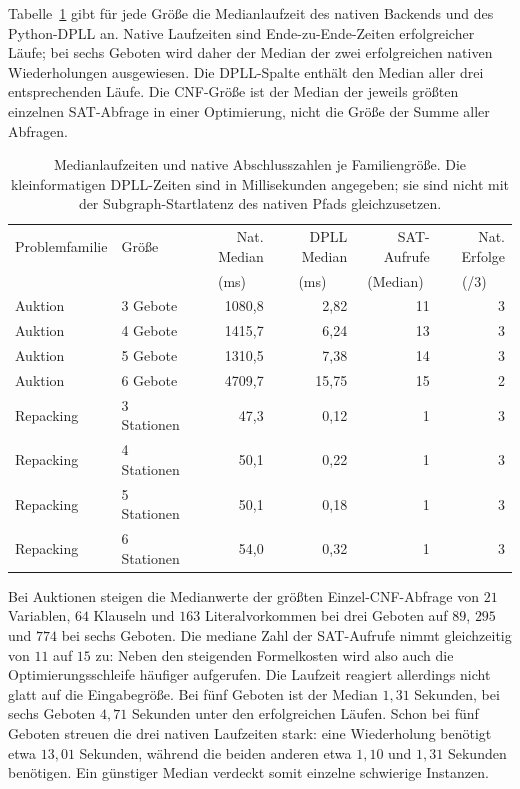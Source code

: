 \documentclass[a4paper,12pt]{article}
\theoremstyle{definition}
\begin{document}
Tabelle~\ref{tab:eco-experiment-runtime} gibt für jede Größe die Medianlaufzeit des nativen Backends und des Python-DPLL an. Native Laufzeiten sind Ende-zu-Ende-Zeiten erfolgreicher Läufe; bei sechs Geboten wird daher der Median der zwei erfolgreichen nativen Wiederholungen ausgewiesen. Die DPLL-Spalte enthält den Median aller drei entsprechenden Läufe. Die CNF-Größe ist der Median der jeweils größten einzelnen SAT-Abfrage in einer Optimierung, nicht die Größe der Summe aller Abfragen.

\begin{table}[ht]
\centering\small
\begin{tabular}{llrrrr}
\toprule
Problemfamilie & Größe & Nat. Median & DPLL Median & SAT-Aufrufe & Nat. Erfolge\\
 & & \multicolumn{1}{c}{(ms)} & \multicolumn{1}{c}{(ms)} & \multicolumn{1}{c}{(Median)} & \multicolumn{1}{c}{(/3)}\\
\midrule
Auktion & 3 Gebote & 1080{,}8 & 2{,}82 & 11 & 3\\
Auktion & 4 Gebote & 1415{,}7 & 6{,}24 & 13 & 3\\
Auktion & 5 Gebote & 1310{,}5 & 7{,}38 & 14 & 3\\
Auktion & 6 Gebote & 4709{,}7 & 15{,}75 & 15 & 2\\
\midrule
Repacking & 3 Stationen & 47{,}3 & 0{,}12 & 1 & 3\\
Repacking & 4 Stationen & 50{,}1 & 0{,}22 & 1 & 3\\
Repacking & 5 Stationen & 50{,}1 & 0{,}18 & 1 & 3\\
Repacking & 6 Stationen & 54{,}0 & 0{,}32 & 1 & 3\\
\bottomrule
\end{tabular}
\caption{Medianlaufzeiten und native Abschlusszahlen je Familiengröße. Die kleinformatigen DPLL-Zeiten sind in Millisekunden angegeben; sie sind nicht mit der Subgraph-Startlatenz des nativen Pfads gleichzusetzen.}
\label{tab:eco-experiment-runtime}
\end{table}

Bei Auktionen steigen die Medianwerte der größten Einzel-CNF-Abfrage von \(21\) Variablen, \(64\) Klauseln und \(163\) Literalvorkommen bei drei Geboten auf \(89\), \(295\) und \(774\) bei sechs Geboten. Die mediane Zahl der SAT-Aufrufe nimmt gleichzeitig von \(11\) auf \(15\) zu: Neben den steigenden Formelkosten wird also auch die Optimierungsschleife häufiger aufgerufen. Die Laufzeit reagiert allerdings nicht glatt auf die Eingabegröße. Bei fünf Geboten ist der Median \(1{,}31\) Sekunden, bei sechs Geboten \(4{,}71\) Sekunden unter den erfolgreichen Läufen. Schon bei fünf Geboten streuen die drei nativen Laufzeiten stark: eine Wiederholung benötigt etwa \(13{,}01\) Sekunden, während die beiden anderen etwa \(1{,}10\) und \(1{,}31\) Sekunden benötigen. Ein günstiger Median verdeckt somit einzelne schwierige Instanzen.
\end{document}
